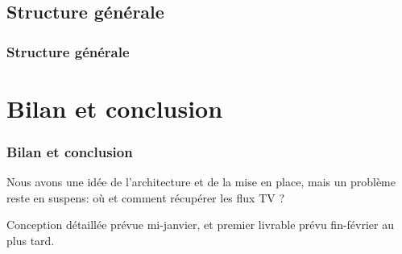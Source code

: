 \documentclass{beamer}
\begin{document}
\subsection{Structure générale}

\begin{frame}	
\frametitle{Structure générale}


\end{frame}

\begin{frame}	

\end{frame}


\section*{Bilan et conclusion}

\begin{frame}	
\frametitle{Bilan et conclusion}


Nous avons une idée de l'architecture et de la mise en place, mais un problème reste en suspens: où et comment récupérer les flux TV ? 


Conception détaillée prévue mi-janvier, et premier livrable prévu fin-février au plus tard.



\end{frame}
\end{document}
